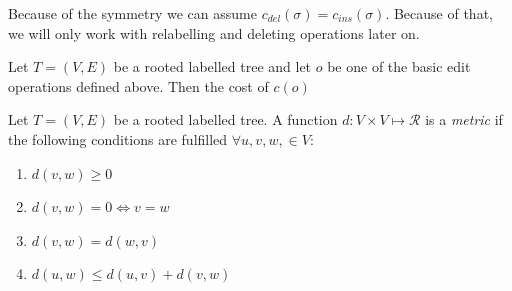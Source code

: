 \begin{rem}
Because of the symmetry we can assume $c_{del}(\sigma) = c_{ins}(\sigma)$. Because of that, we will only work with relabelling and deleting operations later on.
\end{rem}
\begin{defin}
Let $T=(V,E)$ be a rooted labelled tree and let $o$ be one of the basic edit operations defined above. Then the cost of $c(o)$
\end{defin}
\begin{defin}
Let $T=(V,E)$ be a rooted labelled tree. A function $d: V\times V \mapsto \mathcal{R}$ is a \textit{metric} if the following conditions are fulfilled $\forall u,v,w, \in V$:
\begin{enumerate}
\item $d(v,w) \geq 0$
\item $d(v,w) = 0 \iff v=w$
\item $d(v,w) = d(w,v)$
\item $d(u,w) \leq d(u,v) + d(v,w)$
\end{enumerate}
\end{defin}

